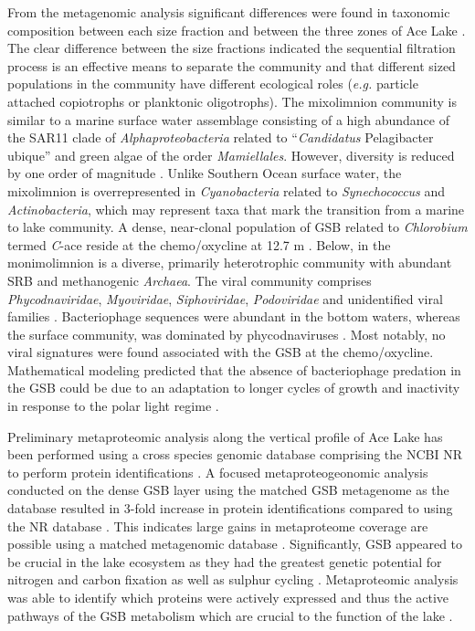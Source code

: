From the metagenomic analysis significant differences were found in taxonomic composition between each size fraction and between the three zones of Ace Lake \cite{Lauro2011}.
The clear difference between the size fractions indicated the sequential filtration process is an effective means to separate the community and that different sized populations in the community have different ecological roles (\emph{e.g.} particle attached copiotrophs or planktonic oligotrophs).
The mixolimnion community is similar to a marine surface water assemblage consisting of a high abundance of the SAR11 clade of \emph{Alphaproteobacteria} related to ``\emph{Candidatus} Pelagibacter ubique'' and green algae of the order \emph{Mamiellales}.
However, diversity is reduced by one order of magnitude \cite{Lauro2011}.
Unlike Southern Ocean surface water, the mixolimnion is overrepresented in \emph{Cyanobacteria} related to \emph{Synechococcus} and \emph{Actinobacteria}, which may represent taxa that mark the transition from a marine to lake community.
A dense, near-clonal population of \acl{GSB} related to \emph{Chlorobium} termed \emph{C}-ace reside at the chemo/oxycline at 12.7 m \cite{Ng2010a, Lauro2011}.
Below, in the monimolimnion is a diverse, primarily heterotrophic community with abundant \ac{SRB} and methanogenic \emph{Archaea}.
The viral community comprises \emph{Phycodnaviridae}, \emph{Myoviridae}, \emph{Siphoviridae}, \emph{Podoviridae} and unidentified viral families \cite{Lauro2011}. 
Bacteriophage sequences were abundant in the bottom waters, whereas the surface community, was dominated by phycodnaviruses \cite{Lauro2011}. 
Most notably, no viral signatures were found associated with the \ac{GSB} at the chemo/oxycline. 
Mathematical modeling predicted that the absence of bacteriophage predation in the \ac{GSB} could be due to an adaptation to longer cycles of growth and inactivity in response to the polar light regime \cite{Lauro2011}. 

Preliminary metaproteomic analysis along the vertical profile of Ace Lake has been performed using a cross species genomic database comprising the \ac{NCBI} \ac{NR} to perform protein identifications \cite{Ng2010b}.
A focused metaproteogeonomic analysis conducted on the dense \ac{GSB} layer using the matched \ac{GSB} metagenome as the database resulted in 3-fold increase in protein identifications compared to using the \ac{NR} database \cite{Ng2010b}.
This indicates large gains in metaproteome coverage are possible using a matched metagenomic database \cite{Ng2010b}.
Significantly, \ac{GSB} appeared to be crucial in the lake ecosystem as they had the greatest genetic potential for nitrogen and carbon fixation as well as sulphur cycling \cite{Ng2010b, Lauro2011}.
Metaproteomic analysis was able to identify which proteins were actively expressed and thus the active pathways of the \ac{GSB} metabolism which are crucial to the function of the lake \cite{Ng2010a}.

